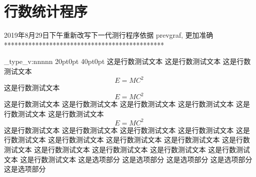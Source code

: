 \documentclass[a4paper,fontset = windowsnew]{ctexbook}
\begin{document}
\chapter{行数统计程序}

\parindent=0pt

2019年8月29日下午重新改写下一代测行程序依据 prevgraf, 更加准确
\ExplSyntaxOn
**********************************************
\par

 \cexam_type_v:nnnnn
 {20pt}{0pt}
 {40pt}{0pt}
 {
    这是行数测试文本
    这是行数测试文本
    这是行数测试文本
    \begin{equation}
      E=MC^2
    \end{equation}
    这是行数测试文本
    \begin{equation}
      E=MC^2
    \end{equation}
    这是行数测试文本
    这是行数测试文本
    这是行数测试文本
    这是行数测试文本
    这是行数测试文本
    这是行数测试文本
    \begin{equation}
      E=MC^2
    \end{equation}
    这是行数测试文本
    这是行数测试文本
    这是行数测试文本
    这是行数测试文本
    这是行数测试文本
    这是行数测试文本
    这是行数测试文本
    这是行数测试文本
    这是行数测试文本
    这是行数测试文本
    这是行数测试文本
    这是行数测试文本
    这是行数测试文本
    这是行数测试文本
  }
  \newline  
  这是选项部分
  这是选项部分
  这是选项部分
  这是选项部分
  这是选项部分
 

    
\end{document}
